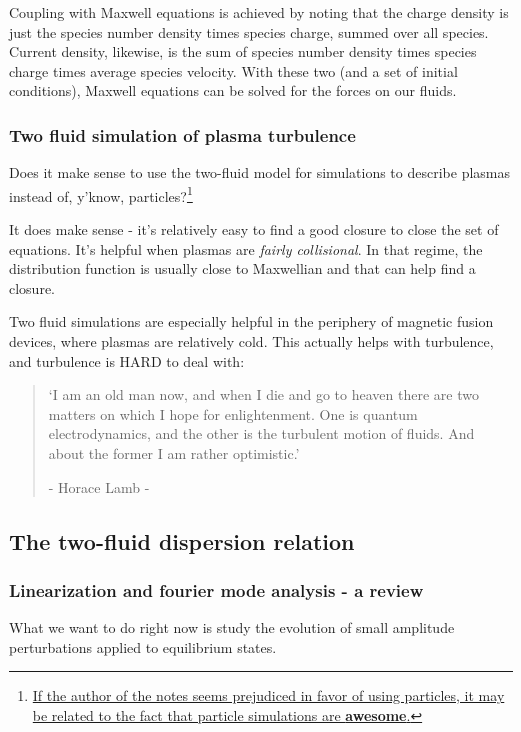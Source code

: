 \documentclass[PlasmaNotes.tex]{subfiles}
\begin{document}
Coupling with Maxwell equations is achieved by noting that the charge density is just the species number density times species charge, summed over all species. Current density, likewise, is the sum of species number density times species charge times average species velocity. With these two (and a set of initial conditions), Maxwell equations can be solved for the forces on our fluids.

\subsubsection{Two fluid simulation of plasma turbulence}

Does it make sense to use the two-fluid model for simulations to describe plasmas instead of, y'know, particles?\footnote{\href{https://www.youtube.com/watch?v=5sGKuoBnTn0&feature=youtu.be}{If the author of the notes seems prejudiced in favor of using particles, it may be related to the fact that particle simulations are \textbf{awesome}.}}

It does make sense - it's relatively easy to find a good closure to close the set of equations. It's helpful when plasmas are \emph{fairly collisional}. In that regime, the distribution function is usually close to Maxwellian and that can help find a closure.

Two fluid simulations are especially helpful in the periphery of magnetic fusion devices, where plasmas are relatively cold. This actually helps with turbulence, and turbulence is HARD to deal with:

\begin{quotation}
	`I am an old man now, and when I die and go to heaven there are two matters on which I hope for enlightenment. One is quantum electrodynamics, and the other is the turbulent motion of fluids. And about the former I am rather optimistic.'
	
- Horace Lamb -
\end{quotation}

\subsection{The two-fluid dispersion relation}
\subsubsection{Linearization and fourier mode analysis - a review}
What we want to do right now is study the evolution of small amplitude perturbations applied to equilibrium states.
\end{document}
